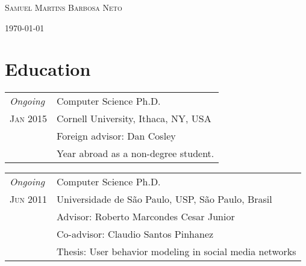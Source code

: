 \documentclass[a4paper,10pt]{article}
\begin{document}
\pagestyle{empty} %

\newcolumntype{R}{X}


\begin{center}
\huge \scshape Samuel Martins Barbosa Neto
\end{center}
\bigskip

\begin{flushright}
\currmonth\today
\end{flushright}





\section{Education}

\begin{tabularx}{\textwidth}{D|R}
\emph{Ongoing}              & Computer Science Ph.D. \\
\textsc{Jan 2015}           & Cornell University, Ithaca, NY, USA\\
                            & \footnotesize Foreign advisor: Dan Cosley\\
                            & \footnotesize Year abroad as a non-degree student.\\
\end{tabularx}

\begin{tabularx}{\textwidth}{D|R}
\emph{Ongoing}              & Computer Science Ph.D. \\
\textsc{Jun 2011}           & Universidade de São Paulo, USP, São Paulo, Brasil\\
                            & \footnotesize Advisor: Roberto Marcondes Cesar Junior\\
                            & \footnotesize Co-advisor: Claudio Santos Pinhanez\\
                            & \footnotesize Thesis: User behavior modeling in social media networks\\
\end{tabularx}
\end{document}
